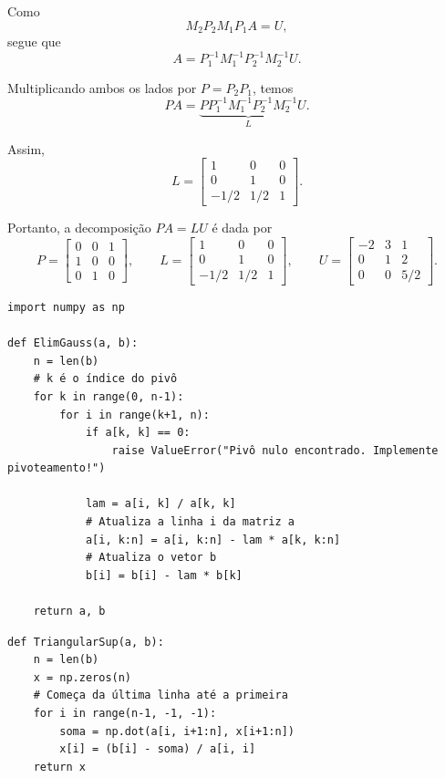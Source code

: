 \documentclass[../numerical_methods.tex]{subfiles}
\begin{document}
\begin{example}
	Como
	\[
		M_2P_2M_1P_1A = U,
	\]
	segue que
	\[
		A=P_1^{-1}M_1^{-1}P_2^{-1}M_2^{-1}U.
	\]

	Multiplicando ambos os lados por \(P=P_2P_1\), temos
	\[
		PA=
		\underbrace{
			PP_1^{-1}M_1^{-1}P_2^{-1}M_2^{-1}
		}_{L}
		U.
	\]

	Assim,
	\[
		L=
		\begin{bmatrix}
			1    & 0   & 0 \\
			0    & 1   & 0 \\
			-1/2 & 1/2 & 1
		\end{bmatrix}.
	\]

	Portanto, a decomposição \(PA=LU\) é dada por
	\[
		P=
		\begin{bmatrix}
			0 & 0 & 1 \\
			1 & 0 & 0 \\
			0 & 1 & 0
		\end{bmatrix},
		\qquad
		L=
		\begin{bmatrix}
			1    & 0   & 0 \\
			0    & 1   & 0 \\
			-1/2 & 1/2 & 1
		\end{bmatrix},
		\qquad
		U=
		\begin{bmatrix}
			-2 & 3 & 1   \\
			0  & 1 & 2   \\
			0  & 0 & 5/2
		\end{bmatrix}.
	\]
\end{example}
\begin{listing}[H]
	\caption{Método da Eliminação de Gauss em Python}
	\begin{verbatim}
import numpy as np

def ElimGauss(a, b):
    n = len(b)
    # k é o índice do pivô
    for k in range(0, n-1):
        for i in range(k+1, n):
            if a[k, k] == 0:
                raise ValueError("Pivô nulo encontrado. Implemente pivoteamento!")

            lam = a[i, k] / a[k, k]
            # Atualiza a linha i da matriz a
            a[i, k:n] = a[i, k:n] - lam * a[k, k:n]
            # Atualiza o vetor b
            b[i] = b[i] - lam * b[k]

    return a, b
  \end{verbatim}
	\begin{verbatim}
def TriangularSup(a, b):
    n = len(b)
    x = np.zeros(n)
    # Começa da última linha até a primeira
    for i in range(n-1, -1, -1):
        soma = np.dot(a[i, i+1:n], x[i+1:n])
        x[i] = (b[i] - soma) / a[i, i]
    return x

  \end{verbatim}
\end{listing}
\end{document}
